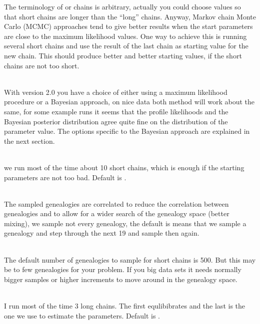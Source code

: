 \par
The terminology of {} or {} chains is arbitrary, actually
you could choose values so that short chains are longer than the ``long''
chains. Anyway, Markov chain Monte Carlo (MCMC) approaches tend 
to give better results when the start parameters are close to the maximum
likelihood values. One way to achieve this is running several short chains
and use the result of the last chain as starting value for the new chain.
This should produce better and better starting values, 
if the short chains are not too short. 

\begin{description}
\item{}\\
With version 2.0 you have a choice of either using a maximum likelihood procedure or a Bayesian approach, on nice data both method will work about the same, for some example runs it seems that the profile likelihoods and the Bayesian posterior distribution agree quite fine on the distribution of the parameter value. The options specific to the Bayesian approach are explained in the next section.
\item{}\\
we run most of the time about 10 short chains, which is enough if the
starting parameters are not too bad. Default is {}.

\item{}\\
The sampled genealogies are correlated to reduce the correlation between genealogies and to allow for a wider search of the genealogy space (better mixing), we sample not every genealogy, the default is {}
means that we sample a genealogy and step through the next 19 and sample then
again.

\item{}\\
The default number of genealogies to sample for short chains is 500.
But this may be to few genealogies for your problem. If you big data sets it
needs normally bigger samples or higher increments
to move around in the genealogy space.

\item{}\\
I run most of the time 3 long chains. The first equlibibrates and the last
is the one we use to estimate the parameters. Default is {}.


\end{description}
